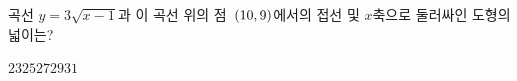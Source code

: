 \hspace*{2mm}\begin{minipage}[t]{\dimexpr\linewidth-2mm\relax}\vspace{0pt}
곡선 $y=3\sqrt{x-1}$과 이 곡선 위의 점~$(10{,}\mkern3mu\mathopen{}9)$에서의 접선 및 $x$축으로 둘러싸인 도형의 넓이는?
\begin{choices32}{$23$}{$25$}{$27$}{$29$}{$31$}\end{choices32}\end{minipage}
